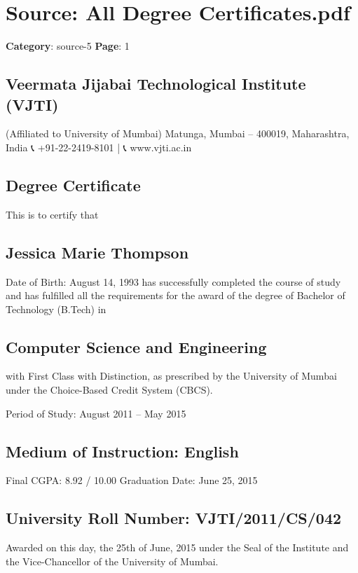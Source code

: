 \section*{Source: All Degree Certificates.pdf}
\textbf{Category}: source-5
\textbf{Page}: 1

\subsection*{Veermata Jijabai Technological Institute (VJTI)}

(Affiliated to University of Mumbai) Matunga, Mumbai – 400019, Maharashtra, India 📞 +91-22-2419-8101 | 📞 www.vjti.ac.in

\subsection*{Degree Certificate}

This is to certify that

\subsection*{Jessica Marie Thompson}

Date of Birth: August 14, 1993 has successfully completed the course of study and has fulfilled all the requirements for the award of the degree of Bachelor of Technology (B.Tech) in

\subsection*{Computer Science and Engineering}

with First Class with Distinction, as prescribed by the University of Mumbai under the Choice-Based Credit System (CBCS).

Period of Study: August 2011 – May 2015

\subsection*{Medium of Instruction: English}

Final CGPA: 8.92 / 10.00 Graduation Date: June 25, 2015

\subsection*{University Roll Number: VJTI/2011/CS/042}

Awarded on this day, the 25th of June, 2015 under the Seal of the Institute and the Vice-Chancellor of the University of Mumbai.

